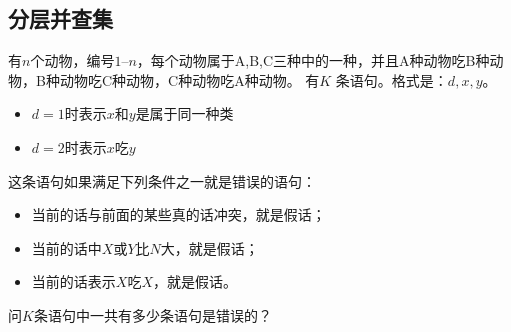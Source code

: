 \subsection{分层并查集}

有$n$个动物，编号$1–n$，每个动物属于A,B,C三种中的一种，并且A种动物吃B种动物，B种动物吃C种动物，C种动物吃A种动物。 有$K$ 条语句。格式是：$d,x,y$。
\begin{itemize}
\item $d = 1$时表示$x$和$y$是属于同一种类
\item $d = 2$时表示$x$吃$y$
\end{itemize}
这条语句如果满足下列条件之一就是错误的语句：
\begin{itemize}
\item 当前的话与前面的某些真的话冲突，就是假话；
\item 当前的话中$X$或$Y$比$N$大，就是假话；
\item 当前的话表示$X$吃$X$，就是假话。
\end{itemize}
问$K$条语句中一共有多少条语句是错误的？ \\

